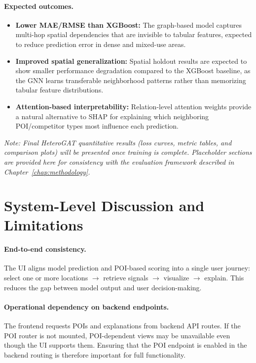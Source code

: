 \paragraph{Expected outcomes.}
\begin{itemize}
    \item \textbf{Lower MAE/RMSE than XGBoost:} The graph-based model captures multi-hop spatial dependencies that are invisible to tabular features, expected to reduce prediction error in dense and mixed-use areas.
    \item \textbf{Improved spatial generalization:} Spatial holdout results are expected to show smaller performance degradation compared to the XGBoost baseline, as the GNN learns transferable neighborhood patterns rather than memorizing tabular feature distributions.
    \item \textbf{Attention-based interpretability:} Relation-level attention weights provide a natural alternative to SHAP for explaining which neighboring POI/competitor types most influence each prediction.
\end{itemize}

\textit{Note: Final HeteroGAT quantitative results (loss curves, metric tables, and comparison plots) will be presented once training is complete. Placeholder sections are provided here for consistency with the evaluation framework described in Chapter~\ref{chap:methodology}.}

\section{System-Level Discussion and Limitations}\label{sec:limitations}

\paragraph{End-to-end consistency.}
The UI aligns model prediction and POI-based scoring into a single user journey: select one or more locations $\rightarrow$ retrieve signals $\rightarrow$ visualize $\rightarrow$ explain. This reduces the gap between model output and user decision-making.

\paragraph{Operational dependency on backend endpoints.}
The frontend requests POIs and explanations from backend API routes. If the POI router is not mounted, POI-dependent views may be unavailable even though the UI supports them. Ensuring that the POI endpoint is enabled in the backend routing is therefore important for full functionality.

